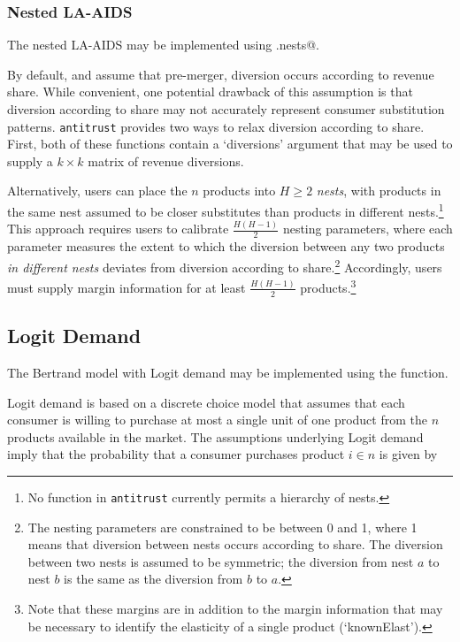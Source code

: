 \documentclass[11pt,numbers=noenddot,pointlessnumbers]{scrreprt}
\newcommand{\atr}{{\tt antitrust}}
\numberwithin{equation}{section}
\begin{document}
\subsubsection{Nested LA-AIDS}
The nested LA-AIDS may be implemented using \verb@pcaids.nests@.

By default, \verb@aids@ and \verb@pcaids@ assume that pre-merger, diversion occurs
according to revenue share. While convenient, one potential drawback of this
assumption is that diversion according to share may not accurately
represent consumer substitution patterns. \atr{} provides two ways to
relax diversion according to share. First, both of these functions contain a `diversions'
argument that may be used to supply a $k \times k$ matrix of
revenue diversions.

Alternatively, users can place the $n$ products
into $H\ge 2$ \emph{nests}, with
products in the same nest assumed to be closer substitutes than
products in different nests.\footnote{No function in \atr{} currently permits
  a hierarchy of nests.} This approach requires users to calibrate
$\frac{H(H-1)}{2}$ nesting parameters, where each parameter measures
the extent to which the diversion between any two products \emph{in different
  nests} deviates from diversion according to share.\footnote{The nesting parameters
  are constrained to be between 0 and 1, where 1 means that diversion
  between nests occurs according to share. The diversion between two
nests is assumed to be symmetric; the diversion from nest $a$ to nest
$b$ is the same as the diversion from $b$ to $a$.} Accordingly, users
must supply margin information for at least $\frac{H(H-1)}{2}$
products.\footnote{Note that these margins are in addition to the margin
  information that may be necessary to identify the elasticity of a
  single product (`knownElast').}


\subsection{Logit Demand}
The Bertrand model with Logit demand may be implemented using the
\verb@logit@ function.

Logit demand is based on a discrete choice model
that assumes that each consumer is
willing to purchase at most a single unit of one product from the
$n$ products available in the market. The assumptions underlying
Logit demand imply that the probability that a consumer
purchases product $i \in n$ is given by
\end{document}
